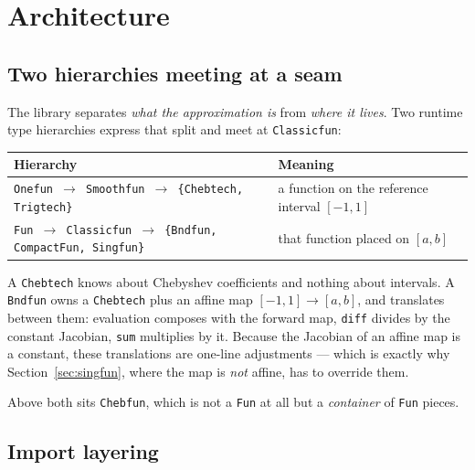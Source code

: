 \documentclass[11pt,a4paper]{article}
\newcommand{\code}[1]{\texttt{#1}}
\begin{document}
\section{Architecture}
\label{sec:architecture}

\subsection{Two hierarchies meeting at a seam}

The library separates \emph{what the approximation is} from \emph{where it
lives}. Two runtime type hierarchies express that split and meet at
\code{Classicfun}:

\begin{center}
\small
\begin{tabular}{@{}>{\raggedright\arraybackslash}p{}
                  >{\raggedright\arraybackslash}p{}@{}}
\toprule
\textbf{Hierarchy} & \textbf{Meaning} \\
\midrule
\code{Onefun $\to$ Smoothfun $\to$\newline
      \{Chebtech, Trigtech\}}
  & a function on the reference interval $[-1,1]$ \\[0.5em]
\code{Fun $\to$ Classicfun $\to$\newline
      \{Bndfun, CompactFun, Singfun\}}
  & that function placed on $[a,b]$ \\
\bottomrule
\end{tabular}
\end{center}

\noindent
A \code{Chebtech} knows about Chebyshev coefficients and nothing about
intervals. A \code{Bndfun} owns a \code{Chebtech} plus an affine map
$[-1,1] \to [a,b]$, and translates between them: evaluation composes with the
forward map, \code{diff} divides by the constant Jacobian, \code{sum}
multiplies by it. Because the Jacobian of an affine map is a constant, these
translations are one-line adjustments --- which is exactly why
Section~\ref{sec:singfun}, where the map is \emph{not} affine, has to override
them.

Above both sits \code{Chebfun}, which is not a \code{Fun} at all but a
\emph{container} of \code{Fun} pieces.

\subsection{Import layering}
\end{document}
